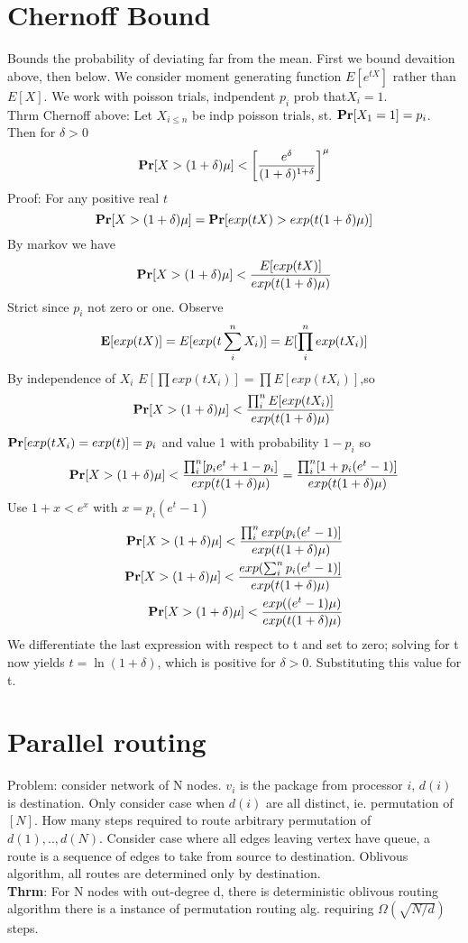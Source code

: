 \documentclass[a4paper]{article}
\def\E{\mbox{\textbf{E}}}
\def\Pr{\mbox{\textbf{Pr}}}
\begin{document}
\section{Chernoff Bound}
Bounds the probability of deviating far from the mean. First we bound devaition above, then below. We consider moment generating function \(E[e^{tX}]\) rather than \(E[X]\). We work with poisson trials, indpendent \(p_i\) prob that\(X_i=1\).\\
Thrm Chernoff above: Let \(X_{i\leq n}\) be indp poisson trials, st. \(\Pr[X_1 = 1] = p_i\). Then for \(\delta > 0\) 
\[\Pr[X>(1+\delta)\mu] < \left[\frac{e^\delta}{(1+\delta)^{1+\delta}}\right]^\mu\]
Proof: For any positive real \(t\)
\[\Pr[X>(1+\delta)\mu]  = \Pr[exp(tX) > exp(t(1+\delta)\mu)]\]
By markov we have
\[\Pr[X>(1+\delta)\mu] < \frac{E[exp(tX)]}{exp(t(1+\delta)\mu)}\]
Strict since \(p_i\) not zero or one. Observe
\[\E[exp(tX)] = E[exp(t\sum_i^n X_i)] = E[\prod_i^n exp(tX_i)]\]
By independence of \(X_i\) \(E[\prod exp(tX_i)] = \prod E[exp(tX_i)]\),so
\[\Pr[X > (1+\delta)\mu] < \frac{\prod_i^n E[exp(tX_i)]}{exp(t(1+\delta)\mu)}\]
\(\Pr[exp(tX_i)=exp(t)] = p_i\) and value 1 with probability \(1-p_i\) so
\[\Pr[X>(1+\delta)\mu] < \frac{\prod_i^n[p_ie^t + 1 - p_i]}{exp(t(1+\delta)\mu)} = \frac{\prod_i^n [1+p_i(e^t-1)]}{exp(t(1+\delta)\mu)}\]
Use \(1+x < e^x\) with \(x = p_i(e^t-1)\) 
\begin{align}
\Pr[X > (1+\delta)\mu] < \frac{\prod_i^n exp(p_i(e^t -1)]}{exp(t(1+\delta)\mu)}\\
\Pr[X > (1+\delta)\mu] < \frac{ exp(\sum_i^n p_i(e^t -1)]}{exp(t(1+\delta)\mu)}\\
\Pr[X > (1+\delta)\mu] < \frac{ exp((e^t -1)\mu)}{exp(t(1+\delta)\mu)}
\end{align}
We differentiate the last expression with respect to t and set to zero; solving for t now yields \(t = \ln(1 + \delta)\), which is positive for \(\delta > 0\). Substituting
this value for t.

\section{Parallel routing}
Problem: consider network of N nodes. \(v_i\) is the package from processor \(i\), \(d(i)\) is destination. Only consider case when \(d(i)\) are all distinct, ie. permutation of \([N]\). How many steps required to route arbitrary permutation of \(d(1),..,d(N)\).
Consider case where all edges leaving vertex have queue, a route is a sequence of edges to take from source to destination. Oblivous algorithm, all routes are determined only by destination. \\
\textbf{Thrm}: For N nodes with out-degree d, there is deterministic oblivous routing algorithm there is a instance of permutation routing alg. requiring \(\Omega(\sqrt{N/d})\) steps.
\end{document}
